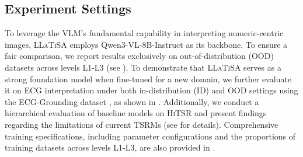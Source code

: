 \documentclass[11pt]{article}
\begin{document}
\subsection{Experiment Settings}
\label{sec:exp_settings}
To leverage the VLM's fundamental capability in interpreting numeric-centric images, \textsc{LLaTiSA} employs Qwen3-VL-8B-Instruct \cite{Qwen3-VL} as its backbone. 
To ensure a fair comparison, we report results exclusively on out-of-distribution (OOD) datasets across levels L1-L3 (see ). To demonstrate that \textsc{LLaTiSA} serves as a strong foundation model when fine-tuned for a new domain, we further evaluate it on ECG interpretation under both in-distribution (ID) and OOD settings using the ECG-Grounding dataset \cite{ecgrounding}, as shown in .
Additionally, we conduct a hierarchical evaluation of baseline models on \textsc{HiTSR} and present findings regarding the limitations of current TSRMs (see  for details). 
Comprehensive training specifications, including parameter configurations and the proportions of training datasets across levels L1-L3, are also provided in .
\end{document}

